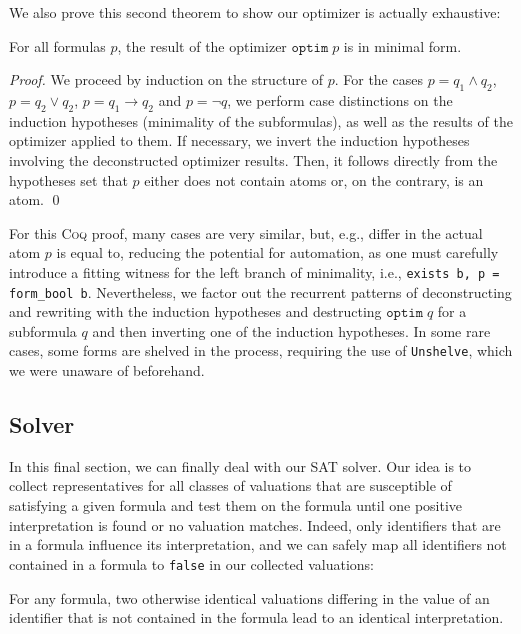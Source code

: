 We also prove this second theorem to show our optimizer is actually exhaustive:
\begin{theorem}
    For all formulas $p$, the result of the optimizer $\texttt{optim}\;p$ is in minimal form.
\end{theorem}
\begin{proof}
    We proceed by induction on the structure of $p$.
    For the cases $p = q_1 \land q_2$, $p = q_2 \lor q_2$, $p = q_1 \rightarrow q_2$ and $p = \neg q$, we perform case distinctions on the induction hypotheses (minimality of the subformulas), as well as the results of the optimizer applied to them.
    If necessary, we invert the induction hypotheses involving the deconstructed optimizer results.
    Then, it follows directly from the hypotheses set that $p$ either does not contain atoms or, on the contrary, is an atom. \qed
\end{proof}
For this \textsc{Coq} proof, many cases are very similar, but, e.g., differ in the actual atom $p$ is equal to, reducing the potential for automation, as one must carefully introduce a fitting witness for the left branch of minimality, i.e., \texttt{exists b, p = form\_bool b}.
Nevertheless, we factor out the recurrent patterns of deconstructing and rewriting with the induction hypotheses and destructing $\texttt{optim}\;q$ for a subformula $q$ and then inverting one of the induction hypotheses. In some rare cases, some forms are shelved in the process, requiring the use of \texttt{Unshelve}, which we were unaware of beforehand.

\subsection{Solver}

In this final section, we can finally deal with our SAT solver.
Our idea is to collect representatives for all classes of valuations that are susceptible of satisfying a given formula and test them on the formula until one positive interpretation is found or no valuation matches.
Indeed, only identifiers that are in a formula influence its interpretation, and we can safely map all identifiers not contained in a formula to \texttt{false} in our collected valuations:
\begin{lemma}
    For any formula, two otherwise identical valuations differing in the value of an identifier that is not contained in the formula lead to an identical interpretation.
\end{lemma}


